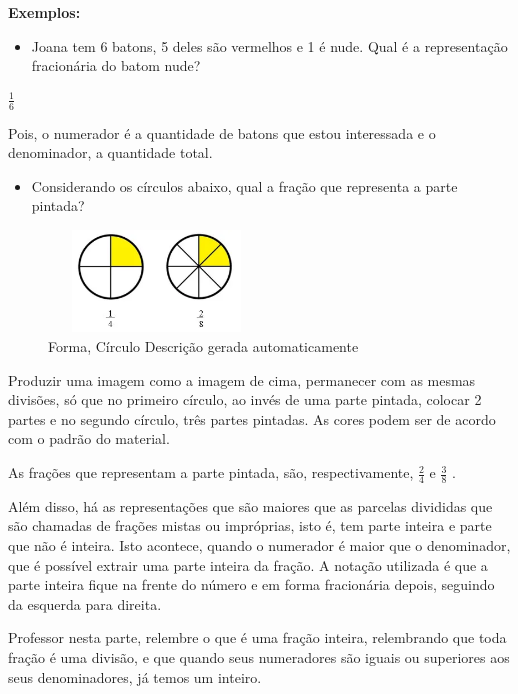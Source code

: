 {{{\textbf{Exemplos:}

\begin{itemize}
\tightlist
\item
  Joana tem 6 batons, 5 deles são vermelhos e 1 é nude. Qual é a
  representação fracionária do batom nude?
\end{itemize}

\(\frac{1}{6}\)

Pois, o numerador é a quantidade de batons que estou interessada e o
denominador, a quantidade total.

\begin{itemize}
\tightlist
\item
  Considerando os círculos abaixo, qual a fração que representa a parte
  pintada?
\end{itemize}

\begin{figure}
\centering
\includegraphics[width=2.26042in,height=1.06783in]{./imgSAEB_7_MAT/media/image4.png}
\caption{Forma, Círculo Descrição gerada automaticamente}
\end{figure}

Produzir uma imagem como a imagem de cima, permanecer com as mesmas
divisões, só que no primeiro círculo, ao invés de uma parte pintada,
colocar 2 partes e no segundo círculo, três partes pintadas. As cores
podem ser de acordo com o padrão do material.

As frações que representam a parte pintada, são, respectivamente,
\(\frac{2}{4}\) e \(\frac{3}{8}\) .

Além disso, há as representações que são maiores que as parcelas
divididas que são chamadas de frações mistas ou impróprias, isto é, tem
parte inteira e parte que não é inteira. Isto acontece, quando o
numerador é maior que o denominador, que é possível extrair uma parte
inteira da fração. A notação utilizada é que a parte inteira fique na
frente do número e em forma fracionária depois, seguindo da esquerda
para direita.

Professor nesta parte, relembre o que é uma fração inteira, relembrando
que toda fração é uma divisão, e que quando seus numeradores são iguais
ou superiores aos seus denominadores, já temos um inteiro.

}}}
